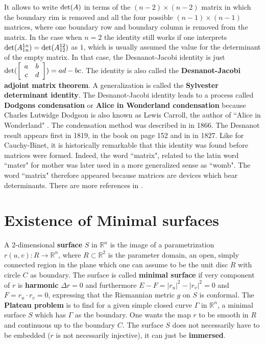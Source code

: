 \documentclass[12pt]{amsart}
\begin{document}
It allows to write ${\rm det}(A)$ in terms of the $(n-2) \times (n-2)$ matrix in which 
the boundary rim is removed and all the four possible $(n-1) \times (n-1)$ matrices, 
where one boundary row and boundary column is removed from the matrix.
In the case when $n=2$ the identity still works if one interprets 
${\rm det}(A_{1n}^{1n})= {\rm det}(A_{12}^{12})$
as $1$, which is usually assumed the value for the determinant of the empty matrix. 
In that case, the Desnanot-Jacobi identity is just
${\rm det}( \left[ \begin{array}{cc} a & b \\ c & d \end{array} \right]) = ad-bc$.
The identity is also called the {\bf Desnanot-Jacobi adjoint matrix theorem}.
A generalization is called the {\bf Sylvester determinant identity}.
The Desnanot-Jacobi identity leads to a process called {\bf Dodgons condensation} or
{\bf Alice in Wonderland condensation} because Charles Lutwidge Dodgson is
also known as Lewis Carroll, the author of ``Alice in Wonderland" \cite{AlicesAdventuresInWonderland}.
The condensation method was described in \cite{Dodgson1866} in 1866. The Desnanot result
appears first in 1819, in the book \cite{Desnanot} on page 152 and in \cite{Jacobi1827} in 1827.
Like for Cauchy-Binet, it is historically remarkable that this identity was found 
before matrices were formed.  Indeed, the word ``matrix", related to the latin word 
``mater" for mother was later used in a more generalized sense as ``womb".
The word ``matrix" therefore appeared because
 matrices are devices which bear determinants.    
There are more references in \cite{Knuth1995}.


\section{Existence of Minimal surfaces}

A $2$-dimensional {\bf surface} $S$ in $\mathbb{R}^n$ is the image of a
parametrization $r(u,v): R \to \mathbb{R}^n$,
where $R \subset \mathbb{R}^2$ is the parameter domain, an open,
simply connected region in the plane which one can assume
to be the unit disc $R$ with circle $C$ as boundary.
The surface is called {\bf minimal surface} if very component of $r$ is
{\bf harmonic} $\Delta r = 0$ and furthermore $E-F=|r_u|^2-|r_v|^2=0$ and
$F=r_u \cdot r_v=0$, expressing that the Riemannian metric
$g$ on $S$ is conformal. The {\bf Plateau problem} is to find for 
a given simple closed curve $\Gamma$ in $\mathbb{R}^n$, a minimal 
surface $S$ which has $\Gamma$ as the boundary. One wants the map $r$
to be smooth in $R$ and continuous up to the boundary $C$. The surface
$S$ does not necessarily have to be embedded ($r$ is not necessarily injective), 
it can just be {\bf immersed}.
\end{document}
